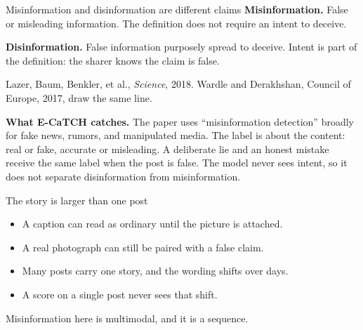 \begin{frame}{Misinformation and disinformation are different claims}
  \textbf{Misinformation.} False or misleading information.
  The definition does not require an intent to deceive.
  \vspace{0.45em}

  \textbf{Disinformation.} False information purposely spread to deceive.
  Intent is part of the definition: the sharer knows the claim is false.
  \vspace{0.35em}

  {\small\color{muted}
    Lazer, Baum, Benkler, et al., \emph{Science}, 2018.
    Wardle and Derakhshan, Council of Europe, 2017, draw the same line.}
  \vspace{0.7em}

  \textbf{What E-CaTCH catches.}
  The paper uses ``misinformation detection'' broadly for fake news, rumors, and manipulated media.
  The label is about the content: real or fake, accurate or misleading.
  A deliberate lie and an honest mistake receive the same label when the post is false.
  The model never sees intent, so it does not separate disinformation from misinformation.
\end{frame}

\begin{frame}{The story is larger than one post}
  \begin{itemize}
    \item A caption can read as ordinary until the picture is attached.
    \item A real photograph can still be paired with a false claim.
    \item Many posts carry one story, and the wording shifts over days.
    \item A score on a single post never sees that shift.
  \end{itemize}
  \vspace{0.8em}
  Misinformation here is multimodal, and it is a sequence.
\end{frame}

